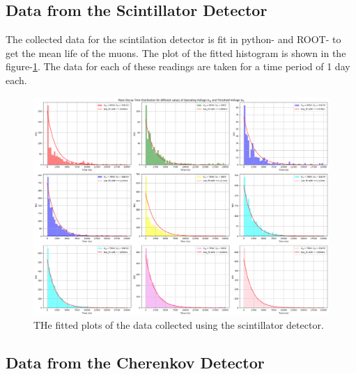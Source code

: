 \documentclass{article}
\begin{document}
\begin{multicols}{2}
\subsection{Data from the Scintillator Detector}
The collected data for the scintilation detector is fit in python-\cite{python} and ROOT-\cite{ROOT} to get the mean life of the muons. The plot of the fitted histogram is shown in the figure-\ref{scintplots}. The data for each of these readings are taken for a time period of 1 day each.
\begin{figure}
    \centering
    \includegraphics[width = 2\columnwidth]{Images/scint_plots.png}
    \caption{THe fitted plots of the data collected using the scintillator detector.}
    \label{scintplots}
\end{figure}

\subsection{Data from the Cherenkov Detector}


\end{multicols}
\end{document}
